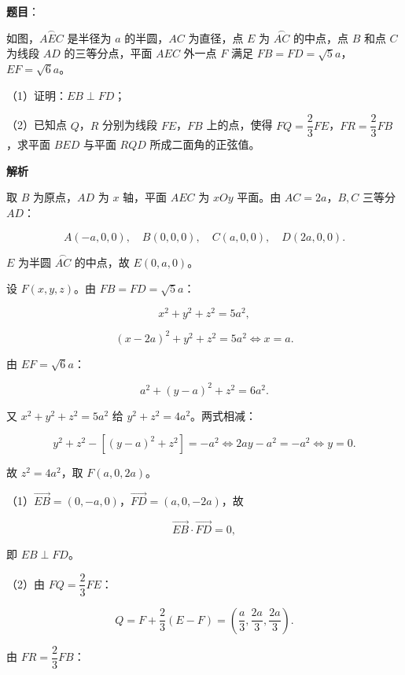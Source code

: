\begin{answer}

\textbf{题目}：

如图，$\overset{\frown}{AEC}$ 是半径为 $a$ 的半圆，$AC$ 为直径，点 $E$ 为 $\overset{\frown}{AC}$ 的中点，点 $B$ 和点 $C$ 为线段 $AD$ 的三等分点，平面 $AEC$ 外一点 $F$ 满足 $FB=FD=\sqrt5a$，$EF=\sqrt6a$。

（1）证明：$EB\perp FD$；

（2）已知点 $Q$，$R$ 分别为线段 $FE$，$FB$ 上的点，使得 $FQ=\dfrac23FE$，$FR=\dfrac23FB$，求平面 $BED$ 与平面 $RQD$ 所成二面角的正弦值。
\nopagebreak[4]
\begin{center}\end{center}
\nopagebreak[4]
\textbf{解析}

取 $B$ 为原点，$AD$ 为 $x$ 轴，平面 $AEC$ 为 $xOy$ 平面。由 $AC=2a$，$B,C$ 三等分 $AD$：

\nopagebreak[4]
\[A(-a,0,0),\quad B(0,0,0),\quad C(a,0,0),\quad D(2a,0,0).\]

$E$ 为半圆 $\overset{\frown}{AC}$ 的中点，故 $E(0,a,0)$。

设 $F(x,y,z)$。由 $FB=FD=\sqrt5a$：

\nopagebreak[4]
\[x^2+y^2+z^2=5a^2,\]

\nopagebreak[4]
\[(x-2a)^2+y^2+z^2=5a^2
\iff x=a.\]

由 $EF=\sqrt6a$：

\nopagebreak[4]
\[a^2+(y-a)^2+z^2=6a^2.\]

又 $x^2+y^2+z^2=5a^2$ 给 $y^2+z^2=4a^2$。两式相减：

\nopagebreak[4]
\[y^2+z^2-\left[(y-a)^2+z^2\right]=-a^2
\iff 2ay-a^2=-a^2
\iff y=0.\]

故 $z^2=4a^2$，取 $F(a,0,2a)$。

（1）$\overrightarrow{EB}=(0,-a,0)$，$\overrightarrow{FD}=(a,0,-2a)$，故

\nopagebreak[4]
\[\overrightarrow{EB}\cdot\overrightarrow{FD}=0,\]

即 $EB\perp FD$。

（2）由 $FQ=\dfrac23FE$：

\nopagebreak[4]
\[Q=F+\frac23(E-F)
=\left(\frac a3,\frac{2a}3,\frac{2a}3\right).\]

由 $FR=\dfrac23FB$：


\end{answer}

